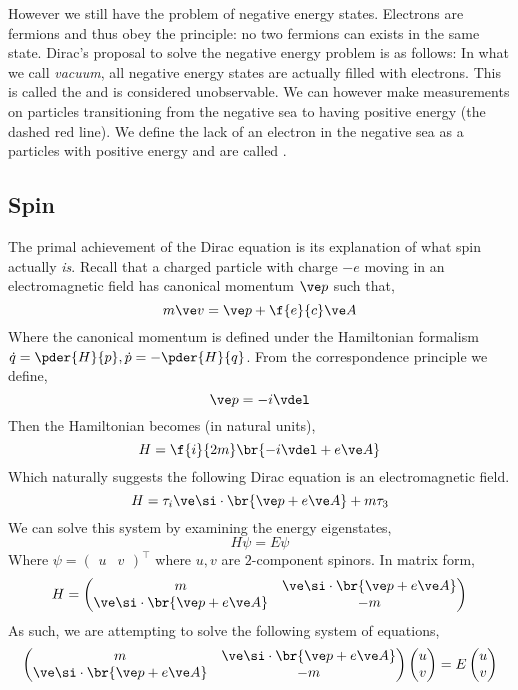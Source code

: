 \documentclass{article}
\begin{document}
However we still have the problem of negative energy states. Electrons are fermions and thus obey the  principle: no two fermions can exists in the same state. Dirac's proposal to solve the negative energy problem is as follows: In what we call \textit{vacuum}, all negative energy states are actually filled with electrons. This is called the  and is considered unobservable. We can however make measurements on particles transitioning from the negative sea to having positive energy (the dashed red line). We define the lack of an electron in the negative sea as a particles with positive energy and are called .

\subsection{Spin}
The primal achievement of the Dirac equation is its explanation of what spin actually \textit{is}. Recall that a charged particle with charge $- e$ moving in an electromagnetic field has canonical momentum $\ve p$ such that,
\[ m \ve v = \ve p + \f{e}{c} \ve A \]
Where the canonical momentum is defined under the Hamiltonian formalism $\dot q = \pder{H}{p}, \dot p = - \pder{H}{q}$. From the correspondence principle we define,
\[ \ve p = - i \vdel \]
Then the Hamiltonian becomes (in natural units),
\[ H = \f{i}{2m} \br{ - i \vdel + e \ve A} \]
Which naturally suggests the following Dirac equation is an electromagnetic field.
\[ H = \tau_i \ve \si \cdot \br{\ve p + e \ve A} + m \tau_3 \]
We can solve this system by examining the energy eigenstates,
\[ H \psi = E \psi \]
Where $\psi = \begin{pmatrix} u & v\end{pmatrix}^{\intercal}$ where $u, v$ are $2$-component spinors. In matrix form,
\[ H = \begin{pmatrix}
    m & \ve \si \cdot \br{\ve p + e \ve A} \\
    \ve \si \cdot \br{\ve p + e \ve A} & -m\\
\end{pmatrix} \]
As such, we are attempting to solve the following system of equations,
\[ \begin{pmatrix}
    m & \ve \si \cdot \br{\ve p + e \ve A} \\
    \ve \si \cdot \br{\ve p + e \ve A} & -m\\
\end{pmatrix}\begin{pmatrix}
    u \\ v
\end{pmatrix} = E\begin{pmatrix}
    u \\ v
\end{pmatrix} \]
\end{document}
